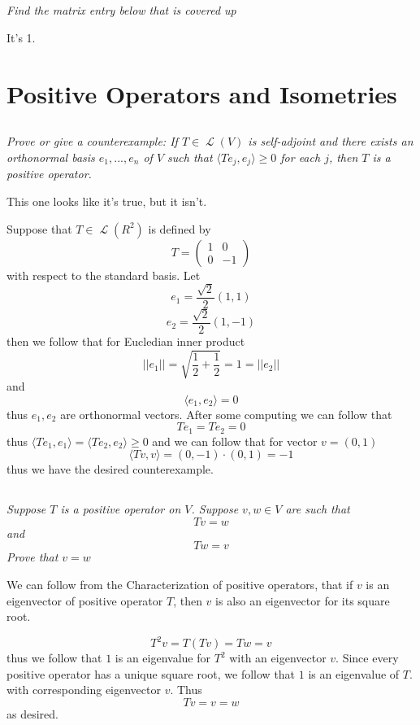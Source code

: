 \documentclass[11pt,oneside,titlepage]{book}
\DeclareMathOperator \map {\mathcal {L}}
\newcommand{\eangle}[1]{\langle #1 \rangle}
\begin{document}
\subsection{}

\textit{Find the matrix entry below that is covered up}

It's 1.

\section{Positive Operators and Isometries}

\subsection{}

\textit{Prove or give a counterexample: If $T \in \map(V)$ is self-adjoint and there
  exists an orthonormal basis $e_1, ..., e_n$ of $V$ such that $\eangle{Te_j, e_j} \geq 0$ for
  each $j$, then $T$ is a positive operator.}

This one looks like it's true, but it isn't.

Suppose that $T \in \map(R^2)$ is defined by
$$T =
\begin{pmatrix}
  1 & 0 \\
  0 & -1
\end{pmatrix}
$$
with respect to the standard basis. Let
$$e_1 = \frac{\sqrt{2}}{2}(1, 1)$$
$$e_2 = \frac{\sqrt{2}}{2}(1, -1)$$
then we follow that for Eucledian inner product
$$||e_1|| = \sqrt{\frac 1 2 + \frac 1 2} = 1 = ||e_2||$$
and
$$\eangle{e_1, e_2} = 0$$
thus $e_1, e_2$ are orthonormal vectors. After some computing we can follow that
$$T e_1 = T e_2 = 0$$
thus $\eangle{T e_1, e_1} = \eangle{T e_2, e_2} \geq 0$
and we can follow that for vector $v = (0, 1)$
$$\eangle{Tv, v} = (0, -1) \cdot (0, 1) = -1$$
thus we have the desired counterexample.

\subsection{}

\textit{Suppose $T$ is a positive operator on $V$. Suppose $v, w \in V$ are such that
$$Tv = w$$
and
$$Tw = v$$
Prove that $v = w$}

We can follow from the Characterization of positive operators, that if $v$ is an
eigenvector of positive operator $T$, then $v$ is also an eigenvector for its
square root. 

$$T^2v = T(Tv) = Tw = v$$
thus we follow that $1$ is an eigenvalue for $T^2$ with an eigenvector $v$.
Since every positive operator has a unique square root, we follow that $1$ is an eigenvalue of $T$.
with corresponding eigenvector $v$. Thus
$$Tv = v = w$$
as desired.
\end{document}
